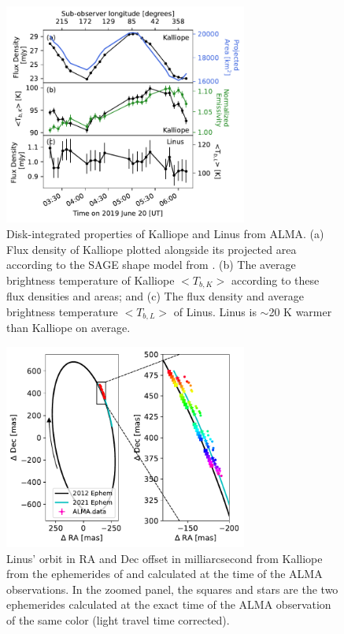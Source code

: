 \documentclass[]{aastex631}
\begin{document}
\begin{figure}[ht!]
\centering
\includegraphics[width=8cm]{DiskInt.pdf}
\caption{Disk-integrated properties of Kalliope and Linus from ALMA. (a) Flux density of Kalliope plotted alongside its projected area according to the SAGE shape model from \cite{ferrais2022}. (b) The average brightness temperature of Kalliope $<T_{b,K}>$ according to these flux densities and areas; and (c) The flux density and average brightness temperature $<T_{b,L}>$ of Linus. Linus is $\sim$20 K warmer than Kalliope on average.\label{fig:diskint}}
\end{figure}

\begin{figure}[ht!]
\centering
\includegraphics[width=8cm]{LinusOrbit2024_v2.pdf}
\caption{Linus' orbit in RA and Dec offset in milliarcsecond from Kalliope from the ephemerides of \cite{vachier2012} and \cite{drummond2021} calculated at the time of the ALMA observations. In the zoomed panel, the squares and stars are the two ephemerides calculated at the exact time of the ALMA observation of the same color (light travel time corrected).} \label{fig:linusorbit}
\end{figure}
\end{document}

